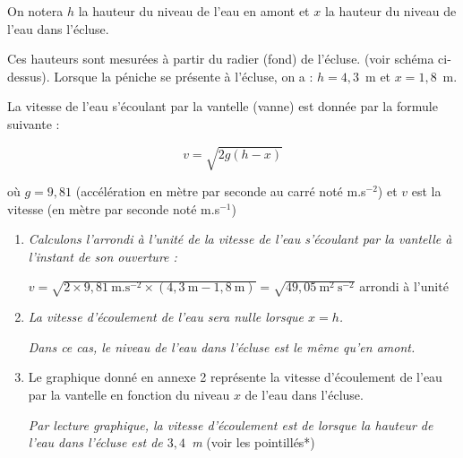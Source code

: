 On notera $h$ la hauteur du niveau de l'eau en amont et $x$ la hauteur du niveau de l'eau dans l'écluse. 

Ces hauteurs sont mesurées à partir du radier (fond) de l'écluse. (voir schéma ci-dessus). Lorsque la péniche se présente à l'écluse, on a : $h = 4,3$~m et $x = 1,8$~m.
 
La vitesse de l'eau s'écoulant par la vantelle (vanne) est donnée par la formule suivante : 

\[v = \sqrt{2g(h - x)}\]
 
où $g = 9,81$ (accélération en mètre par seconde au carré noté m.s$^{-2}$) et $v$ est la vitesse (en mètre par seconde noté m.s$^{-1}$) 

\medskip
 
\begin{enumerate}
\item \textit{Calculons l'arrondi à l'unité de la vitesse de l'eau s'écoulant par la vantelle à l'instant de son ouverture :}

 $v = \sqrt{2\times 9,81~\text{m.s}^{-2}\times(4,3~\text{m} - 1,8~\text{m})}=\sqrt{49,05~\text{m}^ 2~\text{s}^{-2}}$ arrondi à l'unité

\item \textit{La vitesse d'écoulement de l'eau sera nulle lorsque $x=h$.} 

\textit{Dans ce cas, le niveau de l'eau dans l'écluse est le m\^eme qu'en amont.}
\item Le graphique donné en annexe 2 représente la vitesse d'écoulement de l'eau par la vantelle en fonction du niveau $x$ de l'eau dans l'écluse. 

\textit{Par lecture graphique, la vitesse d'écoulement est de  lorsque la hauteur de l'eau dans l'écluse est de $3,4$~m} (voir les pointillés*)
\end{enumerate}
 
\vspace{0,5cm}


